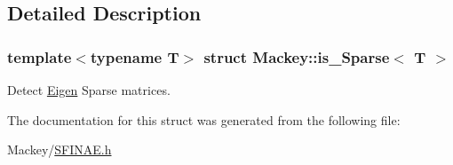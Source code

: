 \subsection{Detailed Description}
\subsubsection*{template$<$typename T$>$\newline
struct Mackey\+::is\+\_\+\+Sparse$<$ T $>$}

Detect \hyperlink{namespaceEigen}{Eigen} Sparse matrices. 

The documentation for this struct was generated from the following file\+:\begin{DoxyCompactItemize}
\item 
Mackey/\hyperlink{SFINAE_8h}{S\+F\+I\+N\+A\+E.\+h}\end{DoxyCompactItemize}

